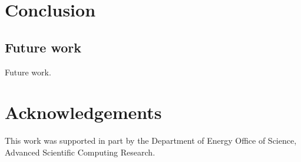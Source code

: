 
\section{Conclusion}

\subsection{Future work}

Future work.

\section{Acknowledgements}

This work was supported in part by the Department of Energy Office of Science,
Advanced Scientific Computing Research.

